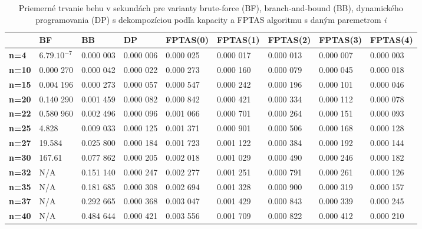 \documentclass[slovak]{article}
\begin{document}
\begin{landscape}
\begingroup
\scriptsize

\begin{table}\centering
	\begin{tabularx}{\linewidth}{ | X | X | X | X | X | X | X | X | X |}
	  \hline                       
					& 	\textbf{BF}	& \textbf{BB}	& \textbf{DP}		& \textbf{FPTAS(0)} 	& \textbf{FPTAS(1)}	& \textbf{FPTAS(2)}		& \textbf{FPTAS(3)}			& \textbf{FPTAS(4)}\\ \hline
	  \textbf{n=4} 	& $6.79.10^{-7}$			& 0.000 003 	& 0.000 006	 		& 0.000 025			& 0.000 017			& 	0.000 013			& 0.000 007		&	0.000 003 	\\ \hline
	  \textbf{n=10} & 0.000 270					& 0.000 042 	& 0.000 022 		& 0.000 273			& 0.000 160			& 	0.000 079			& 0.000 045 	&	0.000 018   \\ \hline
	  \textbf{n=15} & 0.004 196					& 0.000 273 	& 0.000 057 		& 0.000 547			& 0.000 242			& 	0.000 196			& 0.000 101 	&	0.000 046	\\ \hline
	  \textbf{n=20} & 0.140 290					& 0.001 459 	& 0.000 082 		& 0.000 842			& 0.000 421			& 	0.000 334			& 0.000 112 	&	0.000 078	\\ \hline
	  \textbf{n=22} & 0.580 960					& 0.002 496 	& 0.000 096 		& 0.001 066 		& 0.000 701			& 	0.000 264 			& 0.000 151 	&	0.000 093	\\ \hline
	  \textbf{n=25} & 4.828						& 0.009 033 	& 0.000 125 		& 0.001 371 		& 0.000 901			& 	0.000 506			& 0.000 168 	&	0.000 128	\\ \hline
	  \textbf{n=27} & 19.584					& 0.025 800		& 0.000 184 	 	& 0.001 723 		& 0.001 122			& 	0.000 384			& 0.000 192 	&	0.000 144	\\ \hline
	  \textbf{n=30} & 167.61					& 0.077 862		& 0.000 205		 	& 0.002 018			& 0.001 029			& 	0.000 490			& 0.000 246 	&	0.000 182	\\ \hline
	  \textbf{n=32} & N/A						& 0.151 140		& 0.000 247		 	& 0.002 277			& 0.001 251			& 	0.000 791			& 0.000 261 	&	0.000 126	\\ \hline
	  \textbf{n=35} & N/A						& 0.181 685		& 0.000 308		 	& 0.002 694			& 0.001 328			& 	0.000 900			& 0.000 319 	&	0.000 157	\\ \hline
	  \textbf{n=37} & N/A						& 0.292 665		& 0.000 368		 	& 0.003 047			& 0.001 429			& 	0.000 843			& 0.000 339 	&	0.000 245	\\ \hline
	  \textbf{n=40} & N/A						& 0.484 644		& 0.000 421 	 	& 0.003 556			& 0.001 709			& 	0.000 822			& 0.000 412 	&	0.000 210	\\ \hline
	\end{tabularx}
\caption{Priemerné trvanie behu v sekundách pre varianty brute-force (BF), branch-and-bound (BB), dynamického programovania (DP) s dekompozíciou podľa kapacity a FPTAS algoritmu s daným paremetrom \emph{i}}
\label{tab1}
\end{table}
\endgroup
\end{landscape}
\end{document}
